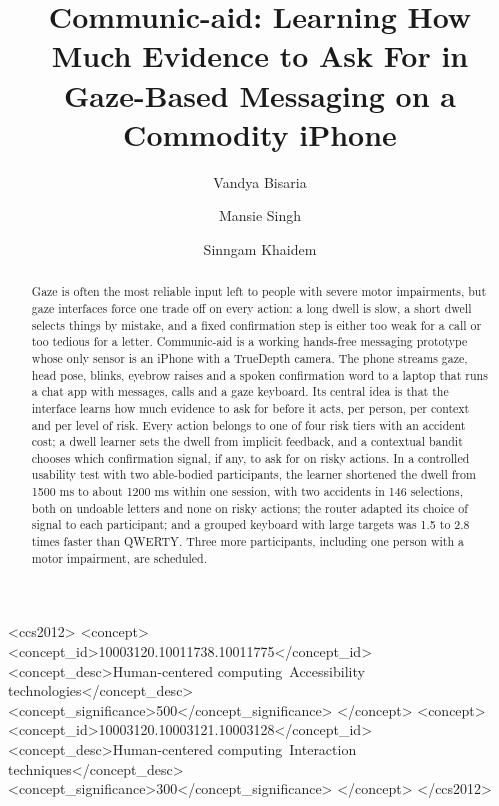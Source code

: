 \documentclass[manuscript,review]{acmart}
\begin{document}
\title[Communic-aid]{Communic-aid: Learning How Much Evidence to Ask For in Gaze-Based Messaging on a Commodity iPhone}

\author{Vandya Bisaria}
\author{Mansie Singh}
\author{Sinngam Khaidem}

\renewcommand{\shortauthors}{Bisaria et al.}

\begin{abstract}
Gaze is often the most reliable input left to people with severe motor impairments, but gaze
interfaces force one trade off on every action: a long dwell is slow, a short dwell selects things
by mistake, and a fixed confirmation step is either too weak for a call or too tedious for a
letter. Communic-aid is a working hands-free messaging prototype whose only sensor is an iPhone
with a TrueDepth camera. The phone streams gaze, head pose, blinks, eyebrow raises and a spoken
confirmation word to a laptop that runs a chat app with messages, calls and a gaze keyboard. Its
central idea is that the interface learns how much evidence to ask for before it acts, per person,
per context and per level of risk. Every action belongs to one of four risk tiers with an accident
cost; a dwell learner sets the dwell from implicit feedback, and a contextual bandit chooses which
confirmation signal, if any, to ask for on risky actions. In a controlled usability test with two
able-bodied participants, the learner shortened the dwell from 1500 ms to about 1200 ms within one
session, with two accidents in 146 selections, both on undoable letters and none on risky actions;
the router adapted its choice of signal to each participant; and a grouped keyboard with large
targets was 1.5 to 2.8 times faster than QWERTY. Three more participants, including one person
with a motor impairment, are scheduled.
\end{abstract}

\begin{CCSXML}
<ccs2012>
<concept>
<concept_id>10003120.10011738.10011775</concept_id>
<concept_desc>Human-centered computing~Accessibility technologies</concept_desc>
<concept_significance>500</concept_significance>
</concept>
<concept>
<concept_id>10003120.10003121.10003128</concept_id>
<concept_desc>Human-centered computing~Interaction techniques</concept_desc>
<concept_significance>300</concept_significance>
</concept>
</ccs2012>
\end{CCSXML}
\end{document}

